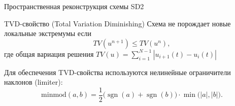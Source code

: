 \documentclass[ignoreonframetext,unicode,aspectratio=169]{beamer}
\begin{document}
	\begin{frame}{Пространственная реконструкция схемы SD2}
		
		\begin{block}{TVD-свойство (Total Variation Diminishing)}
			Схема не порождает новые локальные экстремумы если
			\vspace{-0.2 cm}
			\[
			TV(u^{n+1}) \leq TV(u^{n}),
			\]
			где общая вариация решения $TV(u) = \sum_{i = 1}^{N - 1} |u_{i + 1}(t) - u_i(t)|$
		\end{block}
		
		Для обеспечения TVD-свойства используются нелинейные ограничители наклонов (limiter):
		\vspace{-0.3 cm}
		\[
		\text{minmod}(a,b) = \frac{1}{2} \big( \operatorname{sgn}(a) + \operatorname{sgn}(b) \big) \cdot \min\big( |a|, |b| \big).
		\]
	\end{frame}
\end{document}
